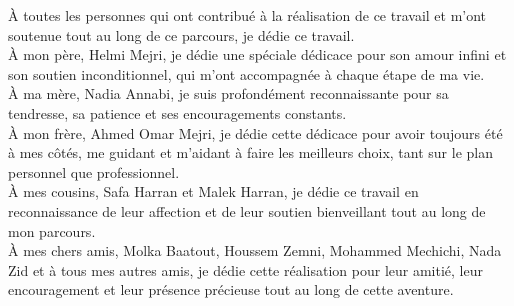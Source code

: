 \begin{center}
  {\huge À} toutes les personnes qui ont contribué à la réalisation de ce travail et m'ont soutenue tout au long de ce parcours, je dédie ce travail.\\
  {\huge À} mon père, Helmi Mejri, je dédie une spéciale dédicace pour son amour infini et son soutien inconditionnel, qui m'ont accompagnée à chaque étape de ma vie.\\
  {\huge À} ma mère, Nadia Annabi, je suis profondément reconnaissante pour sa tendresse, sa patience et ses encouragements constants.\\
  {\huge À} mon frère, Ahmed Omar Mejri, je dédie cette dédicace pour avoir toujours été à mes côtés, me guidant et m’aidant à faire les meilleurs choix, tant sur le plan personnel que professionnel.\\
  {\huge À} mes cousins, Safa Harran et Malek Harran, je dédie ce travail en reconnaissance de leur affection et de leur soutien bienveillant tout au long de mon parcours.\\
  {\huge À} mes chers amis, Molka Baatout, Houssem Zemni, Mohammed Mechichi, Nada Zid et à tous mes autres amis, je dédie cette réalisation pour leur amitié, leur encouragement et leur présence précieuse tout au long de cette aventure.\\
  \end{center}
  
  
